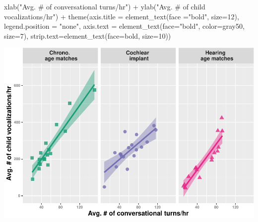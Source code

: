 \documentclass[
]{article}
\newenvironment{Shaded}{\begin{snugshade}}{\end{snugshade}}
\newcommand{\AttributeTok}[1]{\textcolor[rgb]{0.77,0.63,0.00}{#1}}
\newcommand{\DecValTok}[1]{\textcolor[rgb]{0.00,0.00,0.81}{#1}}
\newcommand{\FunctionTok}[1]{\textcolor[rgb]{0.00,0.00,0.00}{#1}}
\newcommand{\NormalTok}[1]{#1}
\newcommand{\SpecialCharTok}[1]{\textcolor[rgb]{0.00,0.00,0.00}{#1}}
\newcommand{\StringTok}[1]{\textcolor[rgb]{0.31,0.60,0.02}{#1}}
\begin{document}
\begin{Shaded}
\begin{Highlighting}[]
  \FunctionTok{xlab}\NormalTok{(}\StringTok{"Avg. \# of conversational turns/hr"}\NormalTok{) }\SpecialCharTok{+}
  \FunctionTok{ylab}\NormalTok{(}\StringTok{"Avg. \# of child vocalizations/hr"}\NormalTok{) }\SpecialCharTok{+} 
    \FunctionTok{theme}\NormalTok{(}\AttributeTok{axis.title =} \FunctionTok{element\_text}\NormalTok{(}\AttributeTok{face =}\StringTok{"bold"}\NormalTok{, }\AttributeTok{size=}\DecValTok{12}\NormalTok{),}
        \AttributeTok{legend.position =} \StringTok{"none"}\NormalTok{, }
        \AttributeTok{axis.text =} \FunctionTok{element\_text}\NormalTok{(}\AttributeTok{face=}\StringTok{"bold"}\NormalTok{, }\AttributeTok{color=}\StringTok{\textquotesingle{}gray50\textquotesingle{}}\NormalTok{, }\AttributeTok{size=}\DecValTok{7}\NormalTok{),}
        \AttributeTok{strip.text=}\FunctionTok{element\_text}\NormalTok{(}\AttributeTok{face=}\StringTok{\textquotesingle{}bold\textquotesingle{}}\NormalTok{, }\AttributeTok{size=}\DecValTok{10}\NormalTok{))}
\end{Highlighting}
\end{Shaded}

\includegraphics{everyday_CI_files/figure-latex/visualize input as turns predicting num vocalizations-1.pdf}
\end{document}
